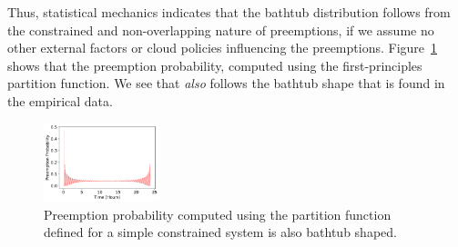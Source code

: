 Thus, statistical mechanics indicates that the bathtub distribution follows from the constrained and non-overlapping nature of preemptions, if we assume no other external factors or cloud policies influencing the preemptions. 
Figure~\ref{fig:partfun} shows that the preemption probability, computed using the first-principles partition function.
We see that \emph{also} follows the bathtub shape that is found in the empirical data. 




\begin{figure}[t]
  \centering
  \includegraphics[width=0.3\textwidth]{../graphs/analytical_prob.pdf}
  \caption{Preemption probability computed using the partition function defined for a simple constrained system is also bathtub shaped.}
  \label{fig:partfun}
\end{figure}

 


